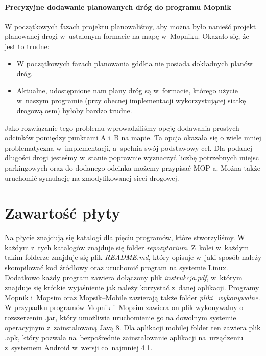 \subsubsection{Precyzyjne dodawanie planowanych dróg do programu Mopnik}
W początkowych fazach projektu planowaliśmy, aby można było nanieść projekt planowanej drogi w~ustalonym formacie na mapę w~Mopniku. Okazało się, że jest to trudne:
\begin{itemize}
\item W początkowych fazach planowania \acrshort{gddkia} nie posiada dokładnych planów dróg.
\item Aktualne, udostępnione nam plany dróg są w~formacie, którego użycie w~naszym programie (przy obecnej implementacji wykorzystującej siatkę drogową \acrshort{osm}) byłoby bardzo trudne.
\end{itemize}
Jako rozwiązanie tego problemu wprowadziliśmy opcję dodawania prostych odcinków pomiędzy punktami A i~B na mapie. Ta opcja okazała się o wiele mniej problematyczna w~implementacji, a~spełnia swój podstawowy cel. Dla podanej długości drogi jesteśmy w~stanie poprawnie wyznaczyć liczbę potrzebnych miejsc parkingowych oraz do dodanego odcinka możemy przypisać MOP-a. Można także uruchomić symulację na zmodyfikowanej sieci drogowej.

\chapter{Zawartość płyty}

Na płycie znajdują się katalogi dla pięciu programów, które stworzyliśmy. W każdym z~tych katalogów znajduje się folder \textit{repozytorium}. Z~kolei w~każdym takim folderze znajduje się plik \textit{README.md}, który opisuje w~jaki sposób należy skompilować kod źródłowy oraz uruchomić program na systemie Linux. Dodatkowo każdy program zawiera dołączony plik \textit{instrukcja.pdf}, w~którym znajduje się krótkie wyjaśnienie jak należy korzystać z~danej aplikacji. Programy Mopnik i~Mopsim oraz Mopsik--Mobile zawierają także folder \textit{pliki\_wykonywalne}. W przypadku programów Mopnik i~Mopsim zawiera on plik wykonywalny o rozszerzeniu .jar, który umożliwia uruchomienie go na dowolnym systemie operacyjnym z~zainstalowaną Javą 8. Dla aplikacji mobilej folder ten zawiera plik .apk, który pozwala na~bezpośrednie zainstalowanie aplikacji na~urządzeniu z~systemem Android w~wersji co~najmniej 4.1.
\begin{figure}[!htb]
\label{dvd_structure}
\end{figure}

